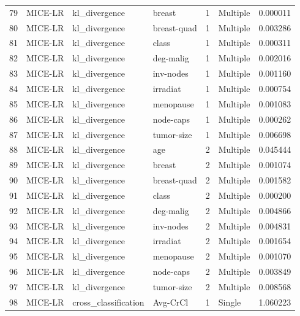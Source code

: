 \begin{tabular}{llllrlr}
79  &  MICE-LR &          kl\_divergence &       breast &    1 &  Multiple &  0.000011 \\
80  &  MICE-LR &          kl\_divergence &  breast-quad &    1 &  Multiple &  0.003286 \\
81  &  MICE-LR &          kl\_divergence &        class &    1 &  Multiple &  0.000311 \\
82  &  MICE-LR &          kl\_divergence &    deg-malig &    1 &  Multiple &  0.002016 \\
83  &  MICE-LR &          kl\_divergence &    inv-nodes &    1 &  Multiple &  0.001160 \\
84  &  MICE-LR &          kl\_divergence &     irradiat &    1 &  Multiple &  0.000754 \\
85  &  MICE-LR &          kl\_divergence &    menopause &    1 &  Multiple &  0.001083 \\
86  &  MICE-LR &          kl\_divergence &    node-caps &    1 &  Multiple &  0.000262 \\
87  &  MICE-LR &          kl\_divergence &   tumor-size &    1 &  Multiple &  0.006698 \\
88  &  MICE-LR &          kl\_divergence &          age &    2 &  Multiple &  0.045444 \\
89  &  MICE-LR &          kl\_divergence &       breast &    2 &  Multiple &  0.001074 \\
90  &  MICE-LR &          kl\_divergence &  breast-quad &    2 &  Multiple &  0.001582 \\
91  &  MICE-LR &          kl\_divergence &        class &    2 &  Multiple &  0.000200 \\
92  &  MICE-LR &          kl\_divergence &    deg-malig &    2 &  Multiple &  0.004866 \\
93  &  MICE-LR &          kl\_divergence &    inv-nodes &    2 &  Multiple &  0.004831 \\
94  &  MICE-LR &          kl\_divergence &     irradiat &    2 &  Multiple &  0.001654 \\
95  &  MICE-LR &          kl\_divergence &    menopause &    2 &  Multiple &  0.001070 \\
96  &  MICE-LR &          kl\_divergence &    node-caps &    2 &  Multiple &  0.003849 \\
97  &  MICE-LR &          kl\_divergence &   tumor-size &    2 &  Multiple &  0.008568 \\
98  &  MICE-LR &   cross\_classification &     Avg-CrCl &    1 &    Single &  1.060223 \\

\end{tabular}
